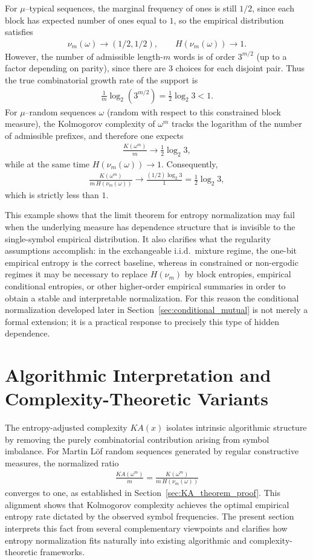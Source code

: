 \documentclass[12pt]{article}
\newcommand{\be}{\begin{eqnarray}}
\newcommand{\ee}{\end{eqnarray}}
\begin{document}
For $\mu$--typical sequences, the marginal frequency of ones is still $1/2$, since each block has expected number of ones equal to $1$, so the empirical distribution satisfies
\be
\nu_m(\omega)\to(1/2,1/2),
\qquad
H(\nu_m(\omega))\to 1.
\ee
However, the number of admissible length-$m$ words is of order $3^{m/2}$ (up to a factor depending on parity), since there are $3$ choices for each disjoint pair. Thus the true combinatorial growth rate of the support is
\be
\frac{1}{m}\log_2(3^{m/2})=\frac{1}{2}\log_2 3 < 1.
\ee
For $\mu$--random sequences $\omega$ (random with respect to this constrained block measure), the Kolmogorov complexity of $\omega^{m}$ tracks the logarithm of the number of admissible prefixes, and therefore one expects
\be
\frac{K(\omega^{m})}{m}\to \frac{1}{2}\log_2 3,
\ee
while at the same time $H(\nu_m(\omega))\to 1$. Consequently,
\be
\frac{K(\omega^{m})}{m\,H(\nu_m(\omega))}
\to
\frac{(1/2)\log_2 3}{1}
=
\frac{1}{2}\log_2 3,
\ee
which is strictly less than $1$.

This example shows that the limit theorem for entropy normalization may fail when the underlying measure has dependence structure that is invisible to the single-symbol empirical distribution. It also clarifies what the regularity assumptions accomplish: in the exchangeable i.i.d.\ mixture regime, the one-bit empirical entropy is the correct baseline, whereas in constrained or non-ergodic regimes it may be necessary to replace $H(\nu_m)$ by block entropies, empirical conditional entropies, or other higher-order empirical summaries in order to obtain a stable and interpretable normalization. For this reason the conditional normalization developed later in Section~\ref{sec:conditional_mutual} is not merely a formal extension; it is a practical response to precisely this type of hidden dependence.

\section{Algorithmic Interpretation and Complexity-Theoretic Variants}
\label{sec:algo_interp}

The entropy-adjusted complexity $KA(x)$ isolates intrinsic algorithmic
structure by removing the purely combinatorial contribution arising from
symbol imbalance. For Martin L\"of random sequences generated by regular
constructive measures, the normalized ratio
\be
\frac{KA(\omega^{m})}{m}
=
\frac{K(\omega^{m})}{m\,H(\nu_m(\omega))}
\label{eq:ratio_limit_algo}
\ee
converges to one, as established in Section~\ref{sec:KA_theorem_proof}. This
alignment shows that Kolmogorov complexity achieves the optimal empirical
entropy rate dictated by the observed symbol frequencies. The present section
interprets this fact from several complementary viewpoints and clarifies how
entropy normalization fits naturally into existing algorithmic and
complexity-theoretic frameworks.
\end{document}
